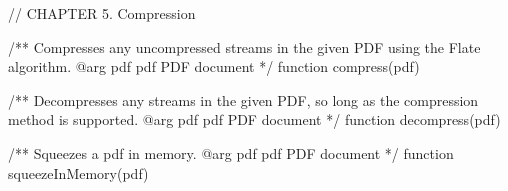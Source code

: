 // CHAPTER 5. Compression

/** Compresses any uncompressed streams in the given PDF using the Flate
algorithm.
@arg {pdf} pdf PDF document */
function compress(pdf) {}

/** Decompresses any streams in the given PDF, so long as the compression
method is supported.
@arg {pdf} pdf PDF document */
function decompress(pdf) {}

/** Squeezes a pdf in memory.
@arg {pdf} pdf PDF document */
function squeezeInMemory(pdf) {}

